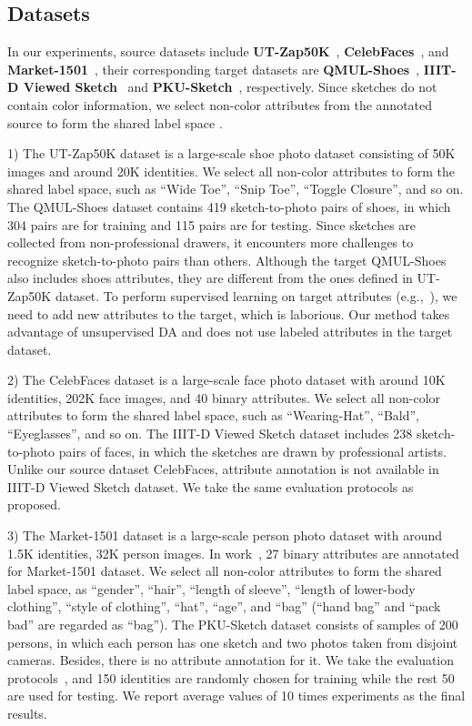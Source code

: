 \documentclass[journal]{IEEEtran}
\begin{document}
\subsection{Datasets}

In our experiments, source datasets include \textbf{UT-Zap50K}~\cite{semjitter}, \textbf{CelebFaces}~\cite{liu2015faceattributes}, and \textbf{Market-1501}~\cite{zheng2015scalable}, their corresponding target datasets are \textbf{QMUL-Shoes}~\cite{yu2016sketch}, \textbf{IIIT-D Viewed Sketch}~\cite{bhatt2012memetically} and \textbf{PKU-Sketch}~\cite{pang2018cross}, respectively. Since sketches do not contain color information, we select non-color attributes from the annotated source to form the shared label space .


1) The UT-Zap50K dataset is a large-scale shoe photo dataset consisting of 50K images and around 20K identities. We select all non-color attributes to form the shared label space, such as ``Wide Toe'', ``Snip Toe'', ``Toggle Closure'', and so on. The QMUL-Shoes dataset contains 419 sketch-to-photo pairs of shoes, in which 304 pairs are for training and 115 pairs are for testing. Since sketches are collected from non-professional drawers, it encounters more challenges to recognize sketch-to-photo pairs than others. Although the target QMUL-Shoes also includes shoes attributes, they are different from the ones defined in UT-Zap50K dataset. To perform supervised learning on target attributes (e.g.,~\cite{liu2018deep}), we need to add new attributes to the target, which is laborious. Our method takes advantage of unsupervised DA and does not use labeled attributes in the target dataset.

2) The CelebFaces dataset is a large-scale face photo dataset with around 10K identities, 202K face images, and 40 binary attributes. We select all non-color attributes to form the shared label space, such as ``Wearing-Hat'', ``Bald'', ``Eyeglasses'', and so on. The IIIT-D Viewed Sketch dataset includes 238 sketch-to-photo pairs of faces, in which the sketches are drawn by professional artists. Unlike our source dataset CelebFaces, attribute annotation is not available in IIIT-D Viewed Sketch dataset. We take the same evaluation protocols as~\cite{wu2018light,deng2019residual} proposed.

3) The Market-1501 dataset is a large-scale person photo dataset with around 1.5K identities, 32K person images. In work~\cite{lin2019improving,wang2019learning}, 27 binary attributes are annotated for Market-1501 dataset. We select all non-color attributes to form the shared label space, as ``gender'', ``hair'', ``length of sleeve'', ``length of lower-body clothing'', ``style of clothing'', ``hat'', ``age'', and ``bag'' (``hand bag'' and ``pack bad'' are regarded as ``bag''). The PKU-Sketch dataset consists of samples of 200 persons, in which each person has one sketch and two photos taken from disjoint cameras. Besides, there is no attribute annotation for it. We take the evaluation protocols~\cite{pang2018cross}, and 150 identities are randomly chosen for training while the rest 50 are used for testing. We report average values of 10 times experiments as the final results.
\end{document}
